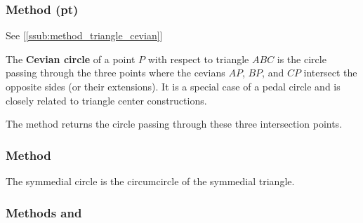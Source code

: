 \subsubsection{Method (pt)}
\label{ssub:_triangle_cevian__circle_pt}

See  [\ref{ssub:method_triangle_cevian}]

The \textbf{Cevian circle} of a point $P$ with respect to triangle $ABC$ is the circle passing through the three points where the cevians $AP$, $BP$, and $CP$ intersect the opposite sides (or their extensions). It is a special case of a pedal circle and is closely related to triangle center constructions.

The method  returns the circle passing through these three intersection points.

\vspace{1em}

\begin{tkzexample}[latex=8cm]
\end{tkzexample}

\subsubsection{Method }
\label{ssub:method_triangle_symmedial_circ}
The symmedial circle is the circumcircle of the symmedial triangle.

\begin{tkzexample}[latex=8cm]
\end{tkzexample}


\subsubsection{Methods  and } %
\label{ssub:method_triangle_conway}

